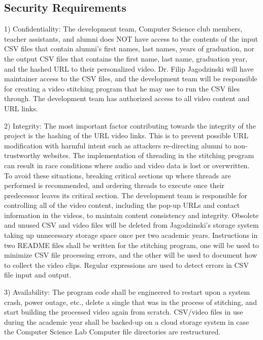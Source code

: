 \subsection{Security Requirements}
%

1) Confidentiality: The development team, Computer Science club members, teacher assistants, and alumni does NOT have access to the
contents of the input CSV files that contain alumni's first names, last names, years of graduation, nor the output CSV files
that contains the first name, last name, graduation year, and the hashed URL to their personalized video.
Dr. Filip Jagodzinski will have maintainer access to the CSV files, and the development team will be responsible for 
creating a video stitching program that he may use to run the CSV files through. The development team has authorized access 
to all video content and URL links.

2) Integrity: The most important factor contributing towards the integrity of the project is the hashing of the URL video links.
This is to prevent possible URL modification with harmful intent such as attackers re-directing alumni to non-trustworthy websites.
The implementation of threading in the stitching program can result in race conditions where audio and video data is lost or overwritten.
To avoid these situations, breaking critical sections up where threads are performed is recommended, and ordering threads to execute once
their predecessor leaves its critical section. The development team is responsible for controlling all of the video content, 
including the pop-up URLs and contact information in the videos, to maintain content consistency and integrity. 
Obsolete and unused CSV and video files will be deleted from Jagodzinski's storage system taking up unnecessary storage space once per 
two academic years. Instructions in two README files shall be written for the stitching program, one will be used to minimize CSV file 
processing errors, and the other will be used to document how to collect the video clips. Regular expressions are used to detect errors 
in CSV file input and output.

3) Availability: The program code shall be engineered to restart upon a system crash, power outage, etc., delete a single that was in 
the process of stitching, and start building the processed video again from scratch. CSV/video files in use during the academic year shall be 
backed-up on a cloud storage system in case the Computer Science Lab Computer file directories are restructured.

